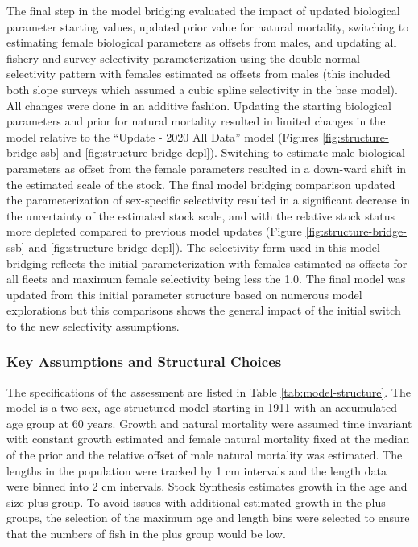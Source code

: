\documentclass[11pt,
  english,
  a4paper,
]{article}
\begin{document}
The final step in the model bridging evaluated the impact of updated biological parameter starting values, updated prior value for natural mortality, switching to estimating female biological parameters as offsets from males, and updating all fishery and survey selectivity parameterization using the double-normal selectivity pattern with females estimated as offsets from males (this included both slope surveys which assumed a cubic spline selectivity in the base model). All changes were done in an additive fashion. Updating the starting biological parameters and prior for natural mortality resulted in limited changes in the model relative to the ``Update - 2020 All Data'' model (Figures \ref{fig:structure-bridge-ssb} and \ref{fig:structure-bridge-depl}). Switching to estimate male biological parameters as offset from the female parameters resulted in a down-ward shift in the estimated scale of the stock. The final model bridging comparison updated the parameterization of sex-specific selectivity resulted in a significant decrease in the uncertainty of the estimated stock scale, and with the relative stock status more depleted compared to previous model updates (Figure \ref{fig:structure-bridge-ssb} and \ref{fig:structure-bridge-depl}). The selectivity form used in this model bridging reflects the initial parameterization with females estimated as offsets for all fleets and maximum female selectivity being less the 1.0. The final model was updated from this initial parameter structure based on numerous model explorations but this comparisons shows the general impact of the initial switch to the new selectivity assumptions.

\leavevmode\tagmcend\tagstructend\par


\hypertarget{key-assumptions-and-structural-choices}{%
\subsubsection{Key Assumptions and Structural Choices}\label{key-assumptions-and-structural-choices}}

\leavevmode\tagmcend\tagstructend


The specifications of the assessment are listed in Table \ref{tab:model-structure}. The model is a two-sex, age-structured model starting in 1911 with an accumulated age group at 60 years. Growth and natural mortality were assumed time invariant with constant growth estimated and female natural mortality fixed at the median of the prior and the relative offset of male natural mortality was estimated. The lengths in the population were tracked by 1 cm intervals and the length data were binned into 2 cm intervals. Stock Synthesis estimates growth in the age and size plus group. To avoid issues with additional estimated growth in the plus groups, the selection of the maximum age and length bins were selected to ensure that the numbers of fish in the plus group would be low.
\end{document}
